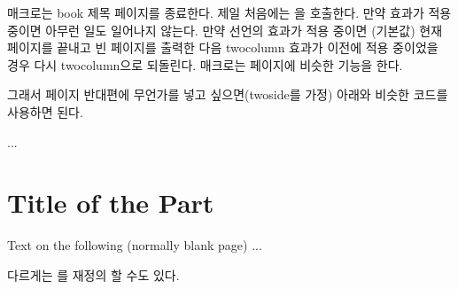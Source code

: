 \cmd{\bookpageend} 매크로는 book 제목 페이지를 종료한다. 제일 처음에는
\cmd{\afterbookskip}을 호출한다. 만약 \cmd{\nobookblankpage} 효과가 적용 중이면
아무런 일도 일어나지 않는다. 만약 \cmd{\bookblankpage} 선언의 효과가 적용 중이면
(기본값) 현재 페이지를 끝내고 빈 페이지를 출력한 다음 twocolumn 효과가 \cmd{\book}
이전에 적용 중이었을 경우 다시 twocolumn으로 되돌린다. \cmd{\partpageend} 매크로는
\cmd{\part} 페이지에 비슷한 기능을 한다.


그래서 \cmd{\part} 페이지 반대편에 무언가를 넣고 싶으면(twoside를 가정) 아래와
비슷한 코드를 사용하면 된다.
\begin{lcode}
...
\nopartblankpage
\part{Title of the Part}
\thispagestyle{simple}
Text on the following (normally blank page)
\clearpage
...
\end{lcode}
다르게는 \cmd{\partpageend}를 재정의 할 수도 있다.

